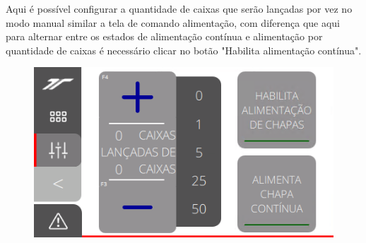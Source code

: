 Aqui é possível configurar a quantidade de caixas que serão lançadas por vez no modo manual similar a tela de comando alimentação, com diferença que aqui
 para alternar entre os estados de alimentação contínua e alimentação por quantidade de caixas é necessário clicar no botão "Habilita alimentação contínua".
\vspace*{\fill}
\begin{figure}[h]
  \centering
  \includegraphics{src/imagesFlexo/11-IHMALM/e-5.png}
\end{figure}
\vspace*{\fill}